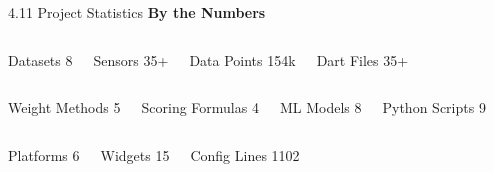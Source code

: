 \documentclass[aspectratio=169]{beamer}
\begin{document}
\begin{frame}[allowframebreaks]{4.11 Project Statistics}
  \centering
  \large \textbf{By the Numbers}

  \vspace{0.5cm}
  \begin{columns}
    \begin{block}{\centering Datasets}
      \centering \huge 8
    \end{block}

    \begin{block}{\centering Sensors}
      \centering \huge 35+
    \end{block}

    \begin{block}{\centering Data Points}
      \centering \huge 154k
    \end{block}

    \begin{block}{\centering Dart Files}
      \centering \huge 35+
    \end{block}
  \end{columns}

  \vspace{0.3cm}
  \begin{columns}
    \begin{block}{\centering Weight Methods}
      \centering \huge 5
    \end{block}

    \begin{block}{\centering Scoring Formulas}
      \centering \huge 4
    \end{block}

    \begin{block}{\centering ML Models}
      \centering \huge 8
    \end{block}

    \begin{block}{\centering Python Scripts}
      \centering \huge 9
    \end{block}
  \end{columns}

  \vspace{0.3cm}
  \begin{columns}
    \begin{block}{\centering Platforms}
      \centering \huge 6
    \end{block}

    \begin{block}{\centering Widgets}
      \centering \huge 15
    \end{block}

    \begin{block}{\centering Config Lines}
      \centering \huge 1102
    \end{block}
  \end{columns}
\end{frame}
\end{document}
